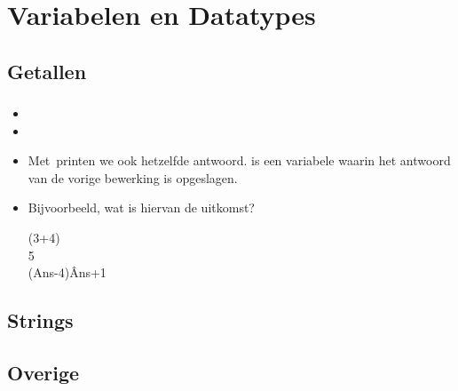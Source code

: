 \section{Variabelen en Datatypes}
\subsection{Getallen}

\begin{frame}
\frametitle{}


\begin{itemize}
  \item {}
\pause%
  \item {}
\pause%
  \item Met \tiANS\tiENTER\,printen we ook hetzelfde antwoord.
		 is een variabele waarin het antwoord van de vorige bewerking is opgeslagen.
\pause%
  \item Bijvoorbeeld, wat is hiervan de uitkomst?
 
\begin{ticalc}[3.25cm]
	\sqrt(3\sq+4\sq)\\
	\hfill 5\\
	(Ans-4)\^Ans+1
	\visible<5->{\\\hfill 2}
\end{ticalc}
\pause%
\end{itemize}
\end{frame}


\subsection{Strings}



\subsection{Overige}



